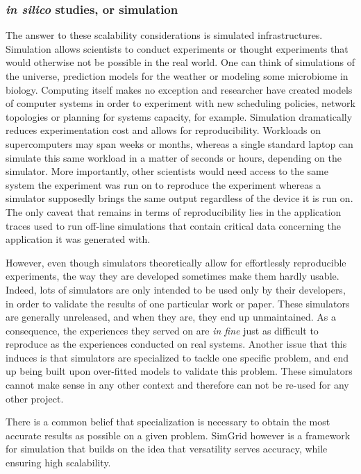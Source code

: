 \subsubsection{\textit{in silico} studies, or simulation}

The answer to these scalability considerations is simulated infrastructures.
Simulation allows scientists to conduct experiments or thought experiments that
would otherwise not be possible in the real world. One can think of simulations
of the universe, prediction models for the weather or modeling some microbiome
in biology. Computing itself makes no exception and researcher have created
models of computer systems in order to experiment with new scheduling policies,
network topologies or planning for systems capacity, for example. Simulation
dramatically reduces experimentation cost and allows for reproducibility.
Workloads on supercomputers may span weeks or months, whereas a single standard
laptop can simulate this same workload in a matter of seconds or hours,
depending on the simulator. More importantly, other scientists would need
access to the same system the experiment was run on to reproduce the experiment
whereas a simulator supposedly brings the same output regardless of the device
it is run on. The only caveat that remains in terms of reproducibility lies in
the application traces used to run off-line simulations that contain critical
data concerning the application it was generated with.

However, even though simulators theoretically allow for effortlessly
reproducible experiments, the way they are developed sometimes make them hardly
usable. Indeed, lots of simulators are only intended to be used only by their
developers, in order to validate the results of one particular work or paper.
These simulators are generally unreleased, and when they are, they end up
unmaintained. As a consequence, the experiences they served on are \textit{in
fine} just as difficult to reproduce as the experiences conducted on real
systems.
Another issue that this induces is that simulators are specialized to tackle
one specific problem, and end up being built upon over-fitted models to
validate this problem. These simulators cannot make sense in any other context
and therefore can not be re-used for any other project.

There is a common belief that specialization is necessary to obtain the most
accurate results as possible on a given problem.
SimGrid \cite{casanova:hal-01017319} however is a framework for simulation that
builds on the idea that versatility serves accuracy, while ensuring high
scalability.

